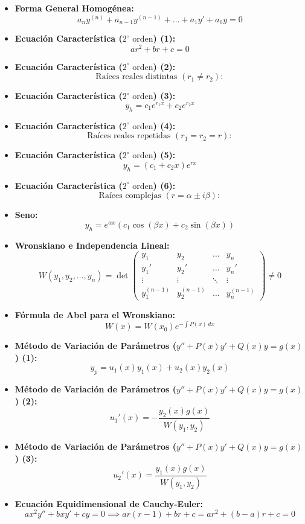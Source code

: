 \documentclass[11pt,a4paper]{article}
\begin{document}
\begin{itemize}
  \item \textbf{Forma General Homogénea:}
  \[
    a_n y^{(n)} + a_{n-1} y^{(n-1)} + \dots + a_1 y' + a_0 y = 0
  \]
  \item \textbf{Ecuación Característica ($2^\circ \text{ orden}$) (1):}
  \[
    a r^2 + b r + c = 0
  \]
  \item \textbf{Ecuación Característica ($2^\circ \text{ orden}$) (2):}
  \[
    \text{Raíces reales distintas } (r_1 \ne r_2):
  \]
  \item \textbf{Ecuación Característica ($2^\circ \text{ orden}$) (3):}
  \[
    y_h = c_1 e^{r_1 x} + c_2 e^{r_2 x}
  \]
  \item \textbf{Ecuación Característica ($2^\circ \text{ orden}$) (4):}
  \[
    \text{Raíces reales repetidas } (r_1 = r_2 = r):
  \]
  \item \textbf{Ecuación Característica ($2^\circ \text{ orden}$) (5):}
  \[
    y_h = (c_1 + c_2 x)e^{r x}
  \]
  \item \textbf{Ecuación Característica ($2^\circ \text{ orden}$) (6):}
  \[
    \text{Raíces complejas } (r = \alpha \pm i\beta):
  \]
  \item \textbf{Seno:}
  \[
    y_h = e^{\alpha x}(c_1 \cos(\beta x) + c_2 \sin(\beta x))
  \]
  \item \textbf{Wronskiano e Independencia Lineal:}
  \[
    W(y_1, y_2, \dots, y_n) = \det\begin{pmatrix} y_1 & y_2 & \dots & y_n \\ y_1' & y_2' & \dots & y_n' \\ \vdots & \vdots & \ddots & \vdots \\ y_1^{(n-1)} & y_2^{(n-1)} & \dots & y_n^{(n-1)} \end{pmatrix} \ne 0
  \]
  \item \textbf{Fórmula de Abel para el Wronskiano:}
  \[
    W(x) = W(x_0) e^{-\int P(x) \, dx}
  \]
  \item \textbf{Método de Variación de Parámetros ($y'' + P(x)y' + Q(x)y = g(x)$) (1):}
  \[
    y_p = u_1(x)y_1(x) + u_2(x)y_2(x)
  \]
  \item \textbf{Método de Variación de Parámetros ($y'' + P(x)y' + Q(x)y = g(x)$) (2):}
  \[
    u_1'(x) = -\frac{y_2(x) g(x)}{W(y_1, y_2)}
  \]
  \item \textbf{Método de Variación de Parámetros ($y'' + P(x)y' + Q(x)y = g(x)$) (3):}
  \[
    u_2'(x) = \frac{y_1(x) g(x)}{W(y_1, y_2)}
  \]
  \item \textbf{Ecuación Equidimensional de Cauchy-Euler:}
  \[
    a x^2 y'' + b x y' + c y = 0 \implies a r(r - 1) + b r + c = a r^2 + (b - a)r + c = 0
  \]
\end{itemize}
\end{document}
